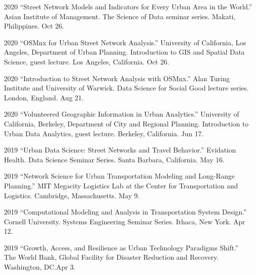 \documentclass[11pt,letterpaper]{report}
\begin{document}
\begin{tablist}
        \item[2020] \tab{}\enquote{Street Network Models and Indicators for Every Urban Area in the World.} Asian Institute of Management. The Science of Data seminar series. Makati, Philippines. Oct 26.

        \item[2020] \tab{}\enquote{OSMnx for Urban Street Network Analysis.} University of California, Los Angeles, Department of Urban Planning. Introduction to GIS and Spatial Data Science, guest lecture. Los Angeles, California. Oct 26.

        \item[2020] \tab{}\enquote{Introduction to Street Network Analysis with OSMnx.} Alan Turing Institute and University of Warwick. Data Science for Social Good lecture series. London, England. Aug 21.

        \item[2020] \tab{}\enquote{Volunteered Geographic Information in Urban Analytics.} University of California, Berkeley, Department of City and Regional Planning. Introduction to Urban Data Analytics, guest lecture. Berkeley, California. Jun 17.


        \item[2019] \tab{}\enquote{Urban Data Science: Street Networks and Travel Behavior.} Evidation Health. Data Science Seminar Series. Santa Barbara, California. May 16.

        \item[2019] \tab{}\enquote{Network Science for Urban Transportation Modeling and Long-Range Planning.} MIT Megacity Logistics Lab at the Center for Transportation and Logistics. Cambridge, Massachusetts. May 9.

        \item[2019] \tab{}\enquote{Computational Modeling and Analysis in Transportation System Design.} Cornell University. Systems Engineering Seminar Series. Ithaca, New York. Apr 12.

        \item[2019] \tab{}\enquote{Growth, Access, and Resilience as Urban Technology Paradigms Shift.} The World Bank, Global Facility for Disaster Reduction and Recovery. Washington, DC.\@ Apr 3.


\end{tablist}
\end{document}
